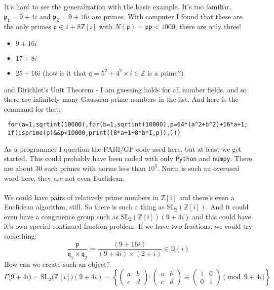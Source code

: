 \documentclass[12pt]{article}
\begin{document}
\newpage

\noindent It's hard to see the generalization with the basic example.  It's too familiar.  $\mathfrak{p}_1 = 9 + 4i$ and $\mathfrak{p}_2 = 9 + 16i$ are primes.  With computer I found that these are the only primes $\mathfrak{p} \in 1 + 8 \mathbb{Z}[i]$ with $N(\mathfrak{p}) = \mathfrak{p}\overline{\mathfrak{p}} < 1000$, there are only three! 
\begin{itemize}
\item  $9 + 16i$
\item  $17 + 8i$
\item $25 + 16i$ (how is it that $\mathfrak{q} = 5^2 + 4^2 \times i \in \mathbb{Z}$ is a prime?)
\end{itemize}
and Dirichlet's Unit Theorem - I am guessing holds for all number fields, and so there are infinitely many Gaussian prime numbers in the list.  And here is the command for that:
\begin{verbatim}
 for(a=1,sqrtint(10000),for(b=1,sqrtint(10000),p=64*(a^2+b^2)+16*a+1;
 if(isprime(p)&&p<10000,print([8*a+1+8*b*I,p]),)))
\end{verbatim}
As a programmer I question the PARI/GP code used here, but at least we get started.  This could probably have been coded with only \texttt{Python} and \texttt{numpy}.  There are about 30 such primes with norms less than $10^5$.  Norm is such an overused word here, they are not even Euclidean.  \\ \\ 
We could have pairs of relatively prime numbers in $\mathbb{Z}[i]$ and there's even a Euclidean algorithm, still.  So there is such a thing as $\text{SL}_2(\mathbb{Z}[i])$.  And it could even have a congruence group such as $\text{SL}_2(\mathbb{Z}[i])(9+4i)$ and this could have it's own special continued fraction problem.  If we have two fractions, we could try something:
$$ \frac{\mathfrak{p}}{\mathfrak{q}_1 \times \mathfrak{q}_2} = \frac{(9+16i)}{(9+4i) \times (2+i)} \in \mathbb{Q}(i)$$
How can we create such an object?
$$ \Gamma\big(9+4i\big) = \text{SL}_2\big(\mathbb{Z}[i]\big)(9+4i) =  \left\{ \left( \begin{array}{cc} a & b \\ c & d \end{array} \right) : 
\left( \begin{array}{cc} a & b \\ c & d \end{array} \right)  \equiv 
\left( \begin{array}{cc} 1 & 0 \\ 0 & 1 \end{array} \right)  \pmod{9+4i}  \right\} $$
\end{document}
